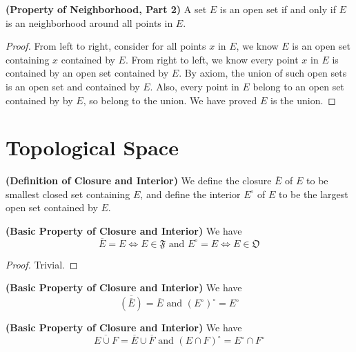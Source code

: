 \documentclass{report}
\begin{document}
\begin{theorem}
\label{2.5.8}
\textbf{(Property of Neighborhood, Part 2)} 
A set $E$ is an open set if and only if $E$ is an neighborhood around all points in $E$.
\end{theorem}
\begin{proof}
From left to right, consider for all points $x$ in  $E$, we know $E$ is an open set containing $x$ contained by  $E$. From right to left, we know every point $x$ in  $E$ is contained by an open set contained by $E$. By axiom, the union of such open sets is an open set and contained by $E$. Also, every point in $E$ belong to an open set contained by by $E$, so belong to the union. We have proved  $E$ is the union. 
\end{proof}
\section{Topological Space}
\begin{definition}
\label{2.6.1}
\textbf{(Definition of Closure and Interior)} We define the closure $\overline{E}$ of $E$ to be smallest closed set containing $E$, and define  the interior $E^\circ$ of  $E$ to be the largest open set contained by  $E$. 
\end{definition}
\begin{theorem}
\label{2.6.2}
\textbf{(Basic Property of Closure and Interior)} We have
\begin{equation}
  \overline{E}=E\iff E\in\mathfrak{F}\text{ and }E^\circ=E\iff E\in\mathfrak{O}
\end{equation}
\end{theorem}
\begin{proof}
Trivial. 
\end{proof}
\begin{corollary}
\label{2.6.3}
\textbf{(Basic Property of Closure and Interior)} We have
\begin{equation} \overline{(\overline{E})}=\overline{E}\text{ and }(E^\circ)^\circ=E^\circ
\end{equation}
\end{corollary}
\begin{theorem}
\label{2.6.4}
\textbf{(Basic Property of Closure and Interior)} We have 
 \begin{equation}
   \overline{E\cup F}=\overline{E}\cup \overline{F}\text{ and }(E\cap F)^\circ=E^\circ \cap F^\circ
\end{equation}
\end{theorem}
\end{document}
